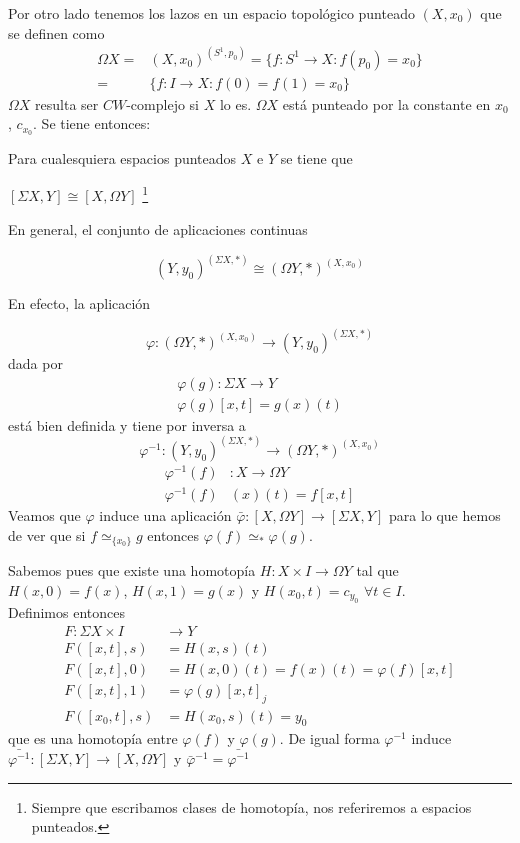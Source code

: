 Por otro lado tenemos los lazos en un espacio topológico punteado $(X, x_0)$ que se definen como
\begin{align*}
\Omega X =& (X, x_0)^{(S^1, p_0)} = \{ f : S^1 \rightarrow X : f(p_0)  = x_0 \} \\ 
=& \{ f : I \rightarrow X : f(0) = f(1) = x_0 \}
\end{align*}
$\Omega X$ resulta ser $CW$-complejo si $X$ lo es. $\Omega X$ está punteado por la constante en $x_0$, $c_{x_0}$. Se tiene entonces: 
\begin{teor}
Para cualesquiera espacios punteados $X$ e  $Y$ se tiene que 
\begin{center}
$[\Sigma X, Y ] \cong [X, \Omega Y]$ \footnote{Siempre que escribamos clases de homotopía, nos referiremos a espacios punteados.}
\end{center}
\end{teor}
\begin{demo}
En general, el conjunto de aplicaciones continuas 

\[ (Y, y_0)^{(\Sigma X, \ast)} \cong (\Omega Y, \ast)^{(X, x_0)} \]

En efecto, la aplicación

\[ \varphi : (\Omega Y, \ast)^{(X, x_0)} \rightarrow (Y, y_0)^{(\Sigma X, \ast)} \]
dada por 
\begin{align*}
\varphi (g) : \Sigma X \longrightarrow Y \\
\varphi (g)[x, t] = g(x)(t)
\end{align*} 
está bien definida y tiene por inversa a 
\[ \varphi^{-1} : (Y, y_0)^{(\Sigma X, \ast)} \rightarrow (\Omega Y, \ast)^{(X, x_0)} \]
\begin{align*}
\varphi^{-1} (f)& : X \rightarrow \Omega Y \\
\varphi^{-1}(f)&(x)(t) = f[x, t]
\end{align*}
Veamos que $\varphi$ induce una aplicación $\bar{\varphi} : [X, \Omega Y] \rightarrow [\Sigma X, Y] $ para lo que hemos de ver que si $f \simeq_{\{ x_0 \}} g$ entonces $\varphi (f) \simeq_{\ast} \varphi (g)$. \par
Sabemos pues que existe una homotopía $H: X \times I \rightarrow \Omega Y$ tal que $H(x,0) = f(x) $, $H(x,1) = g(x)$ y 
$H(x_0, t) = c_{y_0}$ $\forall t \in I$.\\
Definimos entonces 
\begin{align*}
F: \Sigma X \times I &\longrightarrow Y \\
F([x,t],s) &= H(x,s)(t) \\
F([x,t],0) &= H(x,0)(t) = f(x)(t) = \varphi(f)[x,t] \\
F([x,t], 1) &= \varphi(g)[x,t]_j \\
F([x_0,t],s) &= H(x_0, s)(t) = y_0
\end{align*}
que es una homotopía entre $\varphi (f)$ y $\varphi (g)$.
De igual forma $\varphi^{-1}$ induce $\bar{\varphi^{-1}} : [\Sigma X, Y] \rightarrow [X, \Omega Y]$ y $\bar{\varphi}^{-1} = \bar{\varphi^{-1}}$\\
\end{demo}

